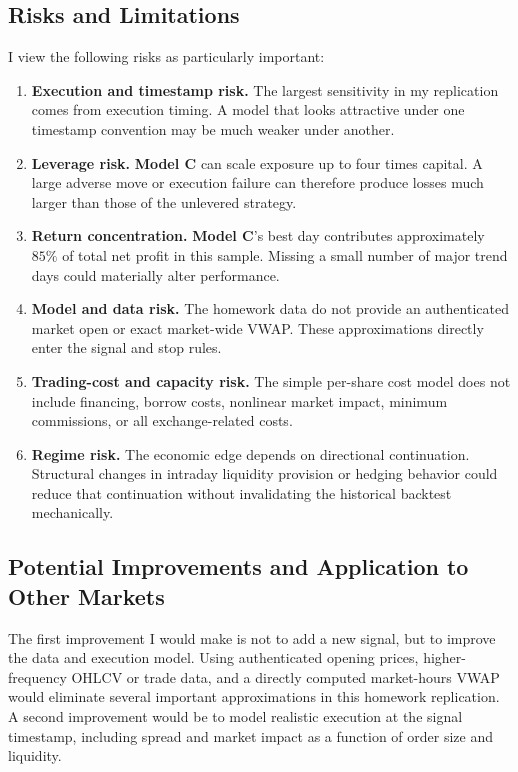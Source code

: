 \documentclass{article}
\begin{document}
\subsection{Risks and Limitations}

I view the following risks as particularly important:
\begin{enumerate}
    \item \textbf{Execution and timestamp risk.} The largest sensitivity in my replication comes from execution timing. A model that looks attractive under one timestamp convention may be much weaker under another.
    \item \textbf{Leverage risk.}\textbf{ Model C} can scale exposure up to four times capital. A large adverse move or execution failure can therefore produce losses much larger than those of the unlevered strategy.
    \item \textbf{Return concentration.}\textbf{ Model C}'s best day contributes approximately \(85\%\) of total net profit in this sample. Missing a small number of major trend days could materially alter performance.
    \item \textbf{Model and data risk.} The homework data do not provide an authenticated market open or exact market-wide VWAP. These approximations directly enter the signal and stop rules.
    \item \textbf{Trading-cost and capacity risk.} The simple per-share cost model does not include financing, borrow costs, nonlinear market impact, minimum commissions, or all exchange-related costs.
    \item \textbf{Regime risk.} The economic edge depends on directional continuation. Structural changes in intraday liquidity provision or hedging behavior could reduce that continuation without invalidating the historical backtest mechanically.
\end{enumerate}

\subsection{Potential Improvements and Application to Other Markets}

The first improvement I would make is not to add a new signal, but to improve the data and execution model. Using authenticated opening prices, higher-frequency OHLCV or trade data, and a directly computed market-hours VWAP would eliminate several important approximations in this homework replication. A second improvement would be to model realistic execution at the signal timestamp, including spread and market impact as a function of order size and liquidity.
\end{document}
